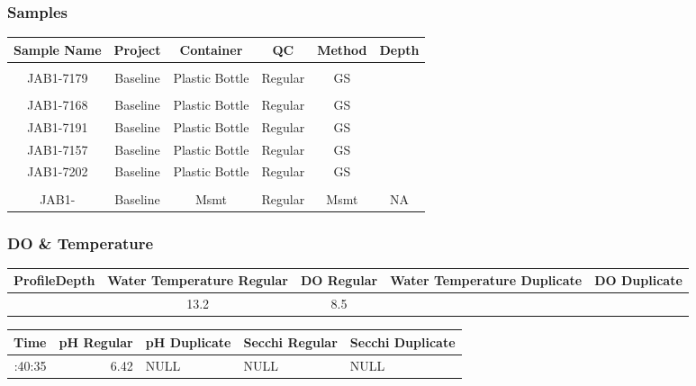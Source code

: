 \documentclass[
  letterpaper,
  DIV=11,
  numbers=noendperiod]{scrartcl}
\begin{document}
\subsubsection{Samples}

\begin{longtable*}{cccccc}
\toprule
Sample Name & Project & Container & QC & Method & Depth \\ 
\midrule\addlinespace[2.5pt]
 \\ 
\midrule\addlinespace[2.5pt]
JAB1-7179 & Baseline & Plastic Bottle & Regular & GS &  \\ 
\midrule\addlinespace[2.5pt]
 \\ 
\midrule\addlinespace[2.5pt]
JAB1-7168 & Baseline & Plastic Bottle & Regular & GS &  \\ 
JAB1-7191 & Baseline & Plastic Bottle & Regular & GS &  \\ 
JAB1-7157 & Baseline & Plastic Bottle & Regular & GS &  \\ 
JAB1-7202 & Baseline & Plastic Bottle & Regular & GS &  \\ 
\midrule\addlinespace[2.5pt]
 \\ 
\midrule\addlinespace[2.5pt]
JAB1- & Baseline & Msmt & Regular & Msmt & NA \\ 
\bottomrule
\end{longtable*}

\subsubsection{DO \& Temperature}

\begin{longtable*}{rcccc}
\toprule
ProfileDepth & Water Temperature Regular & DO Regular & Water Temperature Duplicate & DO Duplicate \\ 
\midrule{} & 13.2 & 8.5 &  &  \\ 
\bottomrule
\end{longtable*}

\begin{longtable*}{rrlll}
\toprule
Time & pH Regular & pH Duplicate & Secchi Regular & Secchi Duplicate \\ 
\midrule{}:40:35 & 6.42 & NULL & NULL & NULL \\ 
\bottomrule
\end{longtable*}
\end{document}
